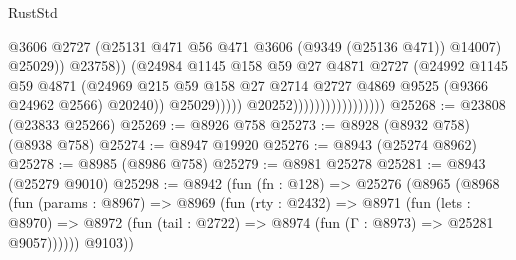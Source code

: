 \begin{lexlean}{RustStd}
\begin{coremodule}
{\begin{coremodule}
{{{{{{{{{{{{{{{{{{{{{{{{{{{{{{{{{{{{{{{                                                      @3606
                                                      @2727
                                                      (@25131
                                                        @471
                                                        @56
                                                        @471
                                                        @3606
                                                        (@9349 (@25136 @471))
                                                        @14007)
                                                      @25029))
                                                  @23758))
                                              (@24984
                                                @1145
                                                @158
                                                @59
                                                @27
                                                @4871
                                                @2727
                                                (@24992
                                                  @1145
                                                  @59
                                                  @4871
                                                  (@24969
                                                    @215
                                                    @59
                                                    @158
                                                    @27
                                                    @2714
                                                    @2727
                                                    @4869
                                                    @9525
                                                    (@9366 @24962 @2566)
                                                    @20240))
                                                @25029)))))
                                      @20252)))))))))))))))))
@25268 := @23808 (@23833 @25266)
@25269 := @8926 @758
@25273 := @8928 (@8932 @758) (@8938 @758)
@25274 := @8947 @19920
@25276 := @8943 (@25274 @8962)
@25278 := @8985 (@8986 @758)
@25279 := @8981 @25278
@25281 := @8943 (@25279 @9010)
@25298 := @8942
    (fun (fn : @128) =>
    @25276
      (@8965
        (@8968
          (fun (params : @8967) =>
          @8969
            (fun (rty : @2432) =>
            @8971
              (fun (lets : @8970) =>
              @8972 (fun (tail : @2722) => @8974 (fun (Γ : @8973) => @25281 @9057))))))
        @9103))
}}}}}}}}}}}}}}}}}}}}}}}}}}}}}}}}}}}}}}}
\end{coremodule}}
\end{coremodule}
\end{lexlean}
